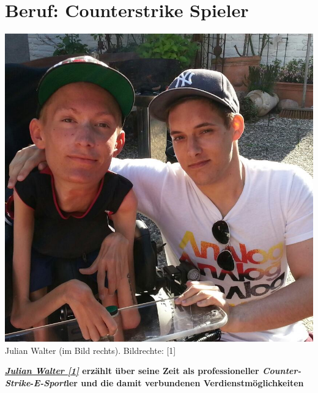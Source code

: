 \section*{Beruf: Counterstrike Spieler}
\hypertarget{counterstrike}{}
\label{counterstrike}
\begin{center}
\includegraphics[width=\linewidth]{counterstrike/julian_walter.jpg} \\
\footnotesize{Julian Walter (im Bild rechts). Bildrechte: [1]}
\end{center}

\textbf{\href{https://plus.google.com/108488461844417773815/about}{\textit{Julian Walter [1]}} erzählt über seine Zeit als professioneller \textit{Counter-Strike}-\textit{E-Sport}ler und die damit verbundenen Verdienstmöglichkeiten} 



